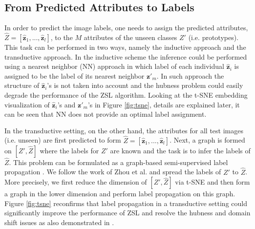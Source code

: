 \documentclass[letterpaper]{article} %
\def\z{\mathbf{z}}
\begin{document}


\subsection{From Predicted Attributes to Labels}

In order to predict the image labels, one needs to assign the predicted attributes, $\hat{Z}=[\hat{\z}_1,...,\hat{\z}_l]$, to the $M$ attributes of the unseen classes $Z'$ (i.e. prototypes). This task can be performed in two ways, namely the inductive approach and the transductive approach. In the inductive scheme the inference could be performed using a nearest neighbor (NN) approach in which label of each individual $\hat{\z}_i$ is assigned to be the label of its nearest neighbor $\z'_m$. In such approach the structure of $\hat{\z}_i$'s is not taken into account and the hubness problem could easily degrade the performance of the ZSL algorithm. Looking at the t-SNE embedding  visualization \cite{maaten2008visualizing} of $\hat{\z}_i$'s and $\z'_m$'s in Figure \ref{fig:tsne}, details are explained later, it can be seen that NN does not provide an optimal label assignment. 

In the transductive setting, on the other hand, the attributes for all test images (i.e. unseen) are first predicted to form $\hat{Z}=[\hat{\z}_1,...,\hat{\z}_l]$. Next, a graph is formed on $[Z',\hat{Z}]$ where the labels for $Z'$ are known and the task is to infer the labels of $\hat{Z}$. This problem can be formulated as a graph-based semi-supervised label propagation \cite{belkin2004regularization,zhou2003learning}. We follow the work of Zhou et al. \cite{zhou2003learning} and spread the labels of $Z'$ to $\hat{Z}$. More precisely,  we first reduce the dimension of $[Z',\hat{Z}]$ via t-SNE \cite{maaten2008visualizing} and then form a graph in the lower dimension and perform label propagation on this graph. Figure \ref{fig:tsne} reconfirms that label propagation in a transductive setting could significantly improve the performance of ZSL and resolve the hubness and domain shift issues as also demonstrated in \cite{fu2015transductive,yu2017transductive}. 
\end{document}
